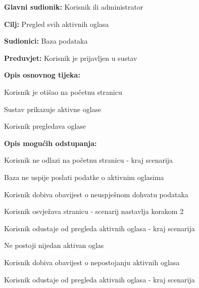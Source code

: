 					\noindent {}
					\begin{packed_item}
	
						\item \textbf{Glavni sudionik: }Korisnik ili administrator
						\item  \textbf{Cilj:} Pregled svih aktivnih oglasa
						\item  \textbf{Sudionici:} Baza podataka
						\item  \textbf{Preduvjet:} Korisnik je prijavljen u sustav
						\item  \textbf{Opis osnovnog tijeka:}
						
						\item[] \begin{packed_enum}
							\item Korisnik je otišao na početnu stranicu
							\item Sustav prikazuje aktivne oglase
							\item Korisnik pregledava oglase
						\end{packed_enum}
						\item  \textbf{Opis mogućih odstupanja:}

						\item[] \begin{packed_item}
							\item[1.a] Korisnik ne odlazi na početnu stranicu - kraj scenarija
							\item[2.a] Baza ne uspije poslati podatke o aktivnim oglasima
							\item[] \begin{packed_enum}
								
								\item Korisnik dobiva obavijest o neuspješnom dohvatu podataka
								\item
									\begin{packed_enum}
										\item Korisnik osvježava stranicu - scenarij nastavlja korakom 2
										\item Korisnik odustaje od pregleda aktivnih oglasa - kraj scenarija
									\end{packed_enum}
							
							\end{packed_enum}	
							\item[2.b] Ne postoji nijedan aktivan oglas
							\item[] \begin{packed_enum}
								
								\item Korisnik dobiva obavijest o nepostojanju aktivnih oglasa
								\item Korisnik odustaje od pregleda aktivnih oglasa - kraj scenarija
							
							\end{packed_enum}
						\end{packed_item}	
					\end{packed_item}


